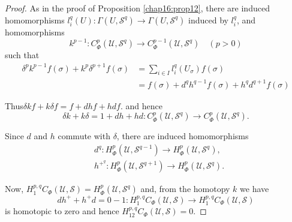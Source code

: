 \begin{proof}%
As in the proof of Proposition \ref{chap16:prop12}, there are induced
homomorphisms 
$l^q_i (U) : \Gamma (U,\mathscr{S}^q) \rightarrow \Gamma
(U,\mathscr{S}^q)$ induced by $l^q_i$, and homomorphisms 
\begin{equation*}
k^{p-1} : C^p_\Phi (\mathscr{U}, \mathscr{S}^q) \rightarrow
C^{p-1}_\Phi (\mathscr{U},\mathscr{S}^q) \quad (p > 0) 
\end{equation*}
such that 
\begin{align*}
\delta^p  k^{p-1}  f(\sigma) + k^p \delta^{p+1}  f(\sigma) & =
\sum_{i \in I} l^{q}_i (U_\sigma) f(\sigma)\\ 
& = f(\sigma) + d^q h^{q-1} f(\sigma) + h^q d^{q+1} f(\sigma)
\end{align*}

Thus\pageoriginale $\delta k  f + k \delta f = f + d  h  f + h  d  f$. and 
hence 
$$
\delta  k + k \delta = 1 + d h + h  d : C^p_\Phi
(\mathscr{U},\mathscr{S}^q) \rightarrow C^p_\Phi  (\mathscr{U},
\mathscr{S}^q). 
$$

Since $d$ and $h$ commute with $\delta$, there are induced
homomorphisms 
\begin{align*}
& d^q : H^p_{\Phi} (\mathscr{U}, \mathscr{S}^{q-1}) \rightarrow
  H^p_{\Phi} (\mathscr{U}, \mathscr{S}^q),\\ 
& h^{+^q} : H^p_\Phi (\mathscr{U}, \mathscr{S}^{q+1}) \rightarrow
  H^p_\Phi (\mathscr{U}, \mathscr{S}^q). 
\end{align*}


Now, $H^{p,q}_1 C_\Phi (\mathscr{U}, \mathscr{S}) = H^p_\Phi 
(\mathscr{U}, \mathscr{S}^q)$ and, from the homotopy $k$ we have  
$$
dh^+ + h^+  d = 0 - 1 : H^{p,q}_1  C_\Phi (\mathscr{U},
\mathscr{S}) \rightarrow H^{p, q}_1  C_\Phi (\mathscr{U},
\mathscr{S}) 
$$
is homotopic to zero and hence $H^{p, q}_{12} C_\Phi  (\mathscr{U},
\mathscr{S}) = 0$. 
\end{proof}


